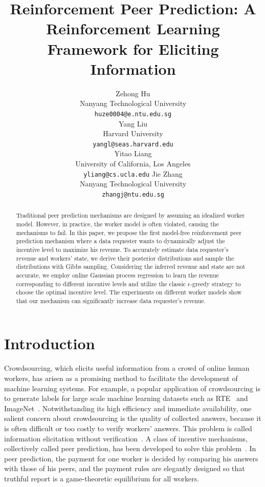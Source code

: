 \documentclass{article}
\title{Reinforcement Peer Prediction: A Reinforcement Learning Framework for Eliciting Information}
\author{
  Zehong Hu \\
  Nanyang Technological University\\
  \texttt{huze0004@e.ntu.edu.sg} \\
  \And
  Yang Liu \\
  Harvard University \\
  \texttt{yangl@seas.harvard.edu}\\
  \And
  Yitao Liang \\
  University of California, Los Angeles \\
  \texttt{yliang@cs.ucla.edu}
   \And
  Jie Zhang \\
  Nanyang Technological University \\
  \texttt{zhangj@ntu.edu.sg}
}
\begin{document}

\maketitle

\begin{abstract}
Traditional peer prediction mechanisms are designed by assuming an idealized worker model.
However, in practice, the worker model is often violated, causing the mechanisms to fail.
In this paper, we propose the first model-free reinforcement peer prediction mechanism where a data requester wants to dynamically adjust the incentive level to maximize his revenue.
To accurately estimate data requester's revenue and workers' state, we derive their posterior distributions and sample the distributions with Gibbs sampling.
Considering the inferred revenue and state are not accurate, we employ online Gaussian process regression to learn the revenue corresponding to different incentive levels and utilize the classic $\epsilon$-greedy strategy to choose the optimal incentive level.
The experiments on different worker models show that our mechanism can significantly increase data requester's revenue.
\end{abstract}

\section{Introduction}
Crowdsourcing, which elicits useful information from a crowd of online human workers, has arisen as a promising method to facilitate the development of machine learning systems.
For example, a popular application of crowdsourcing is to generate labels for large scale machine learning datasets such as RTE~\cite{snow2008cheap} and ImageNet~\cite{deng2009imagenet}.
Notwithstanding its high efficiency and immediate availability, one salient concern about crowdsourcing is the quality of collected answers, because it is often difficult or too costly to verify workers' answers.
This problem is called information elicitation without verification~\cite{waggoner2014output}.
A class of incentive mechanisms, collectively called peer prediction, has been developed to solve this problem~\cite{miller2005eliciting,jurca2009mechanisms,witkowski2012robust,witkowski2012peer,radanovic2013robust}.
In peer prediction, the payment for one worker is decided by comparing his answers with those of his peers, and the payment rules are elegantly designed so that truthful report is a game-theoretic equilibrium for all workers.
\end{document}
